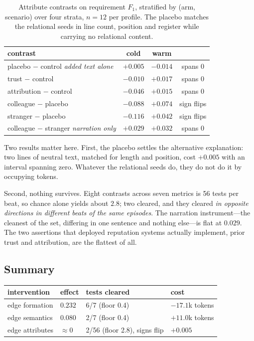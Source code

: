 \begin{table}[t]
\centering\small
\caption{Attribute contrasts on requirement $F_1$, stratified by (arm, scenario)
over four strata, $n=12$ per profile. The placebo matches the relational seeds
in line count, position and register while carrying no relational content.}
\label{tab:attrs}
\begin{tabular}{@{}lccc@{}}
\toprule
\textbf{contrast} & \textbf{cold} & \textbf{warm} & \\
\midrule
placebo $-$ control \hfill\textit{added text alone} & $+0.005$ & $-0.014$ & spans 0 \\
trust $-$ control                                    & $-0.010$ & $+0.017$ & spans 0 \\
attribution $-$ control                              & $-0.046$ & $+0.015$ & spans 0 \\
colleague $-$ placebo                                & $-0.088$ & $\mathbf{+0.074}$ & sign flips \\
stranger $-$ placebo                                 & $\mathbf{-0.116}$ & $+0.042$ & sign flips \\
colleague $-$ stranger \hfill\textit{narration only} & $+0.029$ & $+0.032$ & spans 0 \\
\bottomrule
\end{tabular}
\end{table}

Two results matter here. First, the placebo settles the alternative explanation:
two lines of neutral text, matched for length and position, cost $+0.005$ with an
interval spanning zero. Whatever the relational seeds do, they do not do it by
occupying tokens.

Second, nothing survives. Eight contrasts across seven metrics is 56 tests per
beat, so chance alone yields about $2.8$; two cleared, and they cleared \emph{in
opposite directions in different beats of the same episodes}. The narration
instrument---the cleanest of the set, differing in one sentence and nothing
else---is flat at $0.029$. The two assertions that deployed reputation systems
actually implement, prior trust and attribution, are the flattest of all.

\subsection{Summary}

\begin{center}\small
\begin{tabular}{@{}llll@{}}
\toprule
\textbf{intervention} & \textbf{effect} & \textbf{tests cleared} & \textbf{cost} \\
\midrule
edge formation  & $0.232$ & 6/7 \quad (floor 0.4) & $-17.1$k tokens \\
edge semantics  & $0.080$ & 2/7 \quad (floor 0.4) & $+11.0$k tokens \\
edge attributes & $\approx 0$ & 2/56 \quad (floor 2.8), signs flip & $+0.005$ \\
\bottomrule
\end{tabular}
\end{center}

